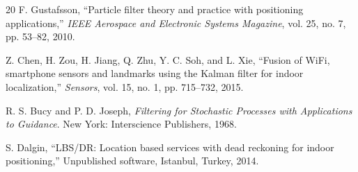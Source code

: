 \documentclass[journal,twocolumn]{IEEEtran}
\begin{document}
\begin{thebibliography}{20}
F. Gustafsson, ``Particle filter theory and practice with positioning applications,'' \textit{IEEE Aerospace and Electronic Systems Magazine}, vol. 25, no. 7, pp. 53--82, 2010.

Z. Chen, H. Zou, H. Jiang, Q. Zhu, Y. C. Soh, and L. Xie, ``Fusion of WiFi, smartphone sensors and landmarks using the Kalman filter for indoor localization,'' \textit{Sensors}, vol. 15, no. 1, pp. 715--732, 2015.

R. S. Bucy and P. D. Joseph, \textit{Filtering for Stochastic Processes with Applications to Guidance}. New York: Interscience Publishers, 1968.

S. Dalgin, ``LBS/DR: Location based services with dead reckoning for indoor positioning,'' Unpublished software, Istanbul, Turkey, 2014.

\end{thebibliography}
\end{document}
